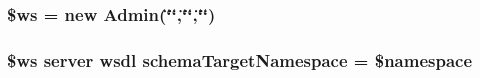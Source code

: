 \subsubsection[{\$ws}]{\setlength{\rightskip}{0pt plus 5cm}\$ws = new {\bf Admin}(\char`\"{}\char`\"{},\char`\"{}\char`\"{},\char`\"{}\char`\"{})}\label{_admin_8php_a311685f250a0c7dbb10444068b95db6d}
\hypertarget{_admin_8php_ab197a5bef9bb7041545b3f0b6db00f8f}{}
\subsubsection[{schema\+Target\+Namespace}]{\setlength{\rightskip}{0pt plus 5cm}\$ws server {\bf wsdl} schema\+Target\+Namespace = \$namespace}\label{_admin_8php_ab197a5bef9bb7041545b3f0b6db00f8f}
